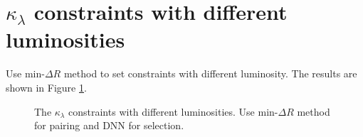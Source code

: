 \documentclass[12pt]{article}
\begin{document}
\section{\texorpdfstring{$\kappa_\lambda$}{kappa} constraints with different luminosities}%
\label{sec:kappa_constraints_with_different_luminosities}
	Use $\text{min-}\Delta R$ method to set constraints with different luminosity. The results are shown in Figure \ref{fig:kappa_constraint_luminosity}.
	\begin{figure}[htpb]
		\centering
		\caption{The $\kappa_\lambda$ constraints with different luminosities. Use $\text{min-}\Delta R$ method for pairing and DNN for selection.}
		\label{fig:kappa_constraint_luminosity}
	\end{figure}
\end{document}
